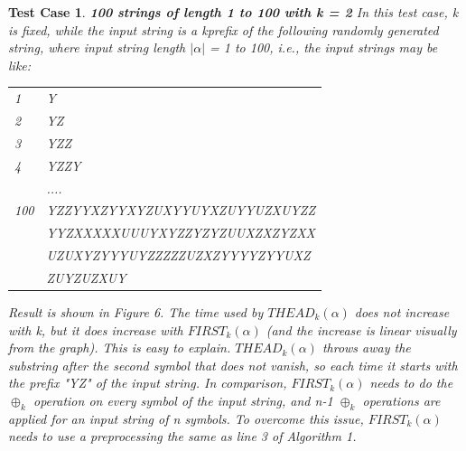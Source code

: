 \documentclass{sig-alternate-05-2015}
\newtheorem{TestCase}{Test Case}
\begin{document}
\begin{TestCase}
\textbf{ 100 strings of length 1 to 100 with k = 2}
In this test case, k is fixed, while the input string is a kprefix
of the following randomly generated string, where
input string length $|\alpha|$ = 1 to 100, i.e., the input strings may
be like:\\
\begin{tabular}{ll}
1   & Y                                                                                                   \\
2   & YZ                                                                                                  \\
3   & YZZ                                                                                                 \\
4   & YZZY                                                                                                \\
    & ....                                                                                                \\
100 & YZZYYXZYYXYZUXYYUYXZUYYUZXUYZZ \\
      & YYZXXXXXUUUYXYZZYZYZUUXZXZYZXX \\
      & UZUXYZYYYUYZZZZZUZXZYYYYZYYUXZ \\
      & ZUYZUZXUY
\end{tabular}

Result is shown in Figure 6. The time used by
$THEAD_k(\alpha)$ does not increase with k, but it does increase
with $FIRST_k(\alpha)$ (and the increase is linear visually from the
graph). This is easy to explain. $THEAD_k(\alpha)$ throws away
the substring after the second symbol that does not vanish,
so each time it starts with the prefix "YZ" of the input
string. In comparison, $FIRST_k(\alpha)$ needs to do the $\oplus_k$ operation
on every symbol of the input string, and  n-1  $\oplus_k$
operations are applied for an input string of n symbols. To
overcome this issue, $FIRST_k(\alpha)$ needs to use a preprocessing
the same as line 3 of Algorithm 1.


\end{TestCase}
\end{document}
